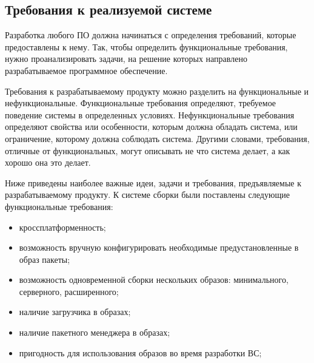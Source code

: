 \subsection{Требования к реализуемой системе}
\label{subsec:build-system-requirements}
Разработка любого ПО должна начинаться с определения требований, которые предоставлены к нему\cite{REQUIREMENTS}.
Так, чтобы определить функциональные требования, нужно проанализировать задачи, на решение которых направлено разрабатываемое программное обеспечение.

Требования к разрабатываемому продукту можно разделить на функциональные и нефункциональные\cite{REQUIREMENTS}.
Функциональные требования определяют, требуемое поведение системы в определенных условиях.
Нефункциональные требования определяют свойства или особенности, которым должна обладать система, или ограничение, которому должна соблюдать система.
Другими словами, требования, отличные от функциональных, могут описывать не что система делает, а как хорошо она это делает\cite{REQUIREMENTS}.

Ниже приведены наиболее важные идеи, задачи и требования, предъявляемые к разрабатываемому продукту.
К системе сборки были поставлены следующие функциональные требования:
\begin{itemize}
  \item кроссплатформенность;
  \item возможность вручную конфигурировать необходимые предустановленные в образ пакеты;
  \item возможность одновременной сборки нескольких образов: минимального, серверного, расширенного;
  \item наличие загрузчика в образах;
  \item наличие пакетного менеджера в образах;
  \item пригодность для использования образов во время разработки ВС;
\end{itemize}
\newpage


